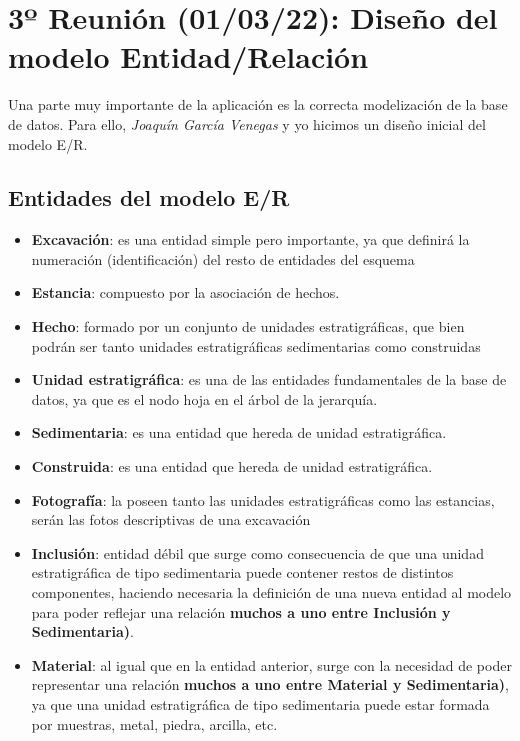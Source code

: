 \section{3º Reunión (01/03/22): Diseño del modelo Entidad/Relación}
Una parte muy importante de la aplicación es la correcta modelización de la base de datos.
Para ello, \textit{Joaquín García Venegas} y yo hicimos un diseño inicial del modelo
E/R.

    \subsection{Entidades del modelo E/R}

        \begin{itemize}
            \item \textbf{Excavación}: es una entidad simple pero importante, ya que definirá
            la numeración (identificación) del resto de entidades del esquema 
            \item \textbf{Estancia}: compuesto por la asociación de hechos.
            \item \textbf{Hecho}: formado por un conjunto de unidades estratigráficas, que
            bien podrán ser tanto unidades estratigráficas sedimentarias como construidas 
            \item \textbf{Unidad estratigráfica}: es una de las entidades fundamentales de
            la base de datos, ya que es el nodo hoja en el árbol de la jerarquía.
            \item \textbf{Sedimentaria}: es una entidad que hereda de unidad estratigráfica.
            \item \textbf{Construida}: es una entidad que hereda de unidad estratigráfica.
            \item \textbf{Fotografía}: la poseen tanto las unidades estratigráficas como las
            estancias, serán las fotos descriptivas de una excavación
            \item \textbf{Inclusión}: entidad débil que surge como consecuencia de que una
            unidad estratigráfica de tipo sedimentaria puede contener restos de distintos
            componentes, haciendo necesaria la definición de una nueva entidad al modelo
            para poder reflejar una relación \textbf{muchos a uno entre Inclusión y
            Sedimentaria)}.
            \item \textbf{Material}: al igual que en la entidad anterior, surge con la
            necesidad de poder representar una relación \textbf{muchos a uno entre Material
            y Sedimentaria)}, ya que una unidad estratigráfica de tipo sedimentaria puede
            estar formada por muestras, metal, piedra, arcilla, etc.
        \end{itemize}


